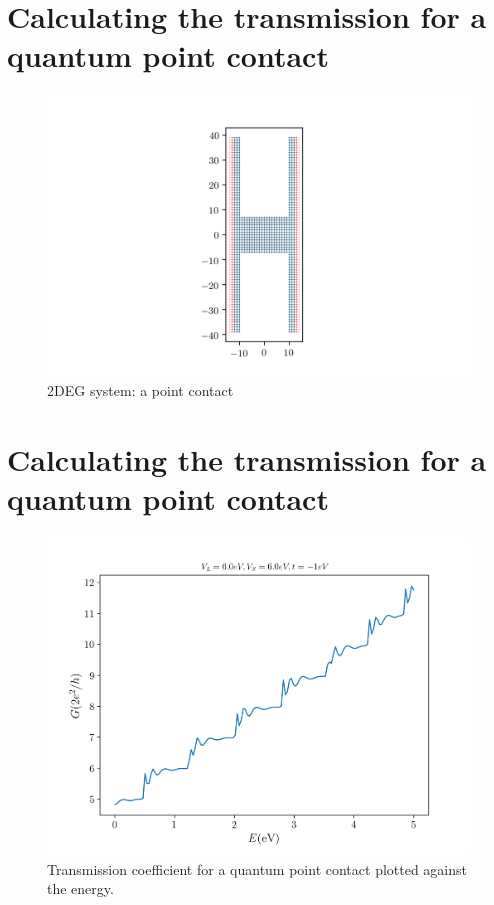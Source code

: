 \documentclass[12pt]{article}
\numberwithin{equation}{section}
\begin{document}
\newpage
\section*{Calculating the transmission for a quantum point contact}
\begin{figure}[h!]
    \begin{center}
        \includegraphics[height=0.7\textheight]{./media/2degconst_W8_L10.png}
        \caption{2DEG system: a point contact}
        \label{fig:2degconst}
    \end{center}
\end{figure}

\newpage
\section*{Calculating the transmission for a quantum point contact}
\begin{figure}[h!]
    \begin{center}
        \includegraphics[height=0.7\textheight]{./media/2deg_conductivity_W40_L20_VL6_0_VS6_0.png}
        \caption{Transmission coefficient for a quantum point contact plotted against the energy.}
        \label{fig:2deg_conductivity_W40_L20_VL6.0_VS6.0.png}
    \end{center}
\end{figure}
\end{document}
